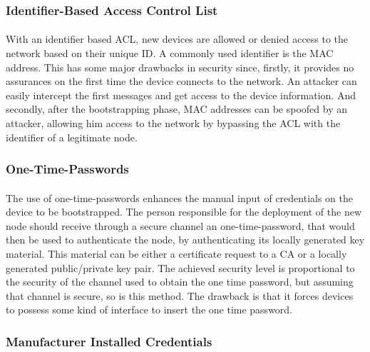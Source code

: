 \subsubsection{Identifier-Based Access Control List}
\paragraph{}
With an identifier based \ac{ACL}, new devices are allowed or denied access to the network based on their unique ID. A commonly used identifier is the MAC address. This has some major drawbacks in security since, firstly, it provides no assurances on the first time the device connects to the network. An attacker can easily intercept the first messages and get access to the device information. And secondly, after the bootstrapping phase, MAC addresses can be spoofed by an attacker, allowing him access to the network by bypassing the \ac{ACL} with the identifier of a legitimate node.

\subsubsection{One-Time-Passwords}
\paragraph{}
The use of one-time-passwords enhances the manual input of credentials on the device to be bootstrapped. The person responsible for the deployment of the new node should receive through a secure channel an one-time-password, that would then be used to authenticate the node, by authenticating its locally generated key material. This material can be either a certificate request to a \ac{CA} or a locally generated public/private key pair. The achieved security level is proportional to the security of the channel used to obtain the one time password, but assuming that channel is secure, so is this method. The drawback is that it forces devices to possess some kind of interface to insert the one time password.

\subsubsection{Manufacturer Installed Credentials}
